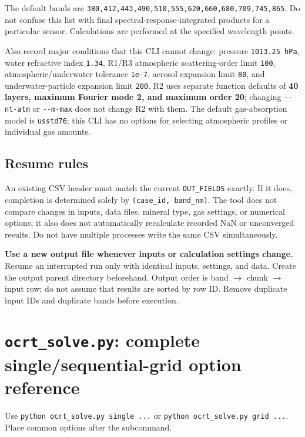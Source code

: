 The default bands are \texttt{380,\allowbreak{}412,\allowbreak{}443,\allowbreak{}490,\allowbreak{}510,\allowbreak{}555,\allowbreak{}620,\allowbreak{}660,\allowbreak{}680,\allowbreak{}709,\allowbreak{}745,\allowbreak{}865}. Do not confuse this list with final spectral-response-integrated products for a particular sensor. Calculations are performed at the specified wavelength points.

Also record major conditions that this CLI cannot change: pressure \texttt{1013.\allowbreak{}25 hPa}, water refractive index \texttt{1.\allowbreak{}34}, R1/R3 atmospheric scattering-order limit \texttt{100}, atmospheric/underwater tolerance \texttt{1e-\allowbreak{}7}, aerosol expansion limit \texttt{80}, and underwater-particle expansion limit \texttt{200}. R2 uses separate function defaults of \textbf{40 layers, maximum Fourier mode 2, and maximum order 20}; changing \texttt{-\allowbreak{}-\allowbreak{}nt-\allowbreak{}atm} or \texttt{-\allowbreak{}-\allowbreak{}m-\allowbreak{}max} does not change R2 with them. The default gas-absorption model is \texttt{usstd76}; this CLI has no options for selecting atmospheric profiles or individual gas amounts.

\subsection{Resume rules}
\label{sec:auto:06_python_batch:4.1}
An existing CSV header must match the current \texttt{OUT\_\allowbreak{}FIELDS} exactly. If it does, completion is determined solely by \texttt{(case\_\allowbreak{}id,\allowbreak{} band\_\allowbreak{}nm)}. The tool does not compare changes in inputs, data files, mineral type, gas settings, or numerical options; it also does not automatically recalculate recorded NaN or unconverged results. Do not have multiple processes write the same CSV simultaneously.

\textbf{Use a new output file whenever inputs or calculation settings change.} Resume an interrupted run only with identical inputs, settings, and data. Create the output parent directory beforehand. Output order is band \ensuremath{\rightarrow} chunk \ensuremath{\rightarrow} input row; do not assume that results are sorted by row ID. Remove duplicate input IDs and duplicate bands before execution.

\section{\texttt{ocrt\_\allowbreak{}solve.\allowbreak{}py}: complete single/sequential-grid option reference}
\label{sec:auto:06_python_batch:5}
Use \texttt{python ocrt\_\allowbreak{}solve.\allowbreak{}py single .\allowbreak{}.\allowbreak{}.\allowbreak{}} or \texttt{python ocrt\_\allowbreak{}solve.\allowbreak{}py grid .\allowbreak{}.\allowbreak{}.\allowbreak{}}. Place common options after the subcommand.


